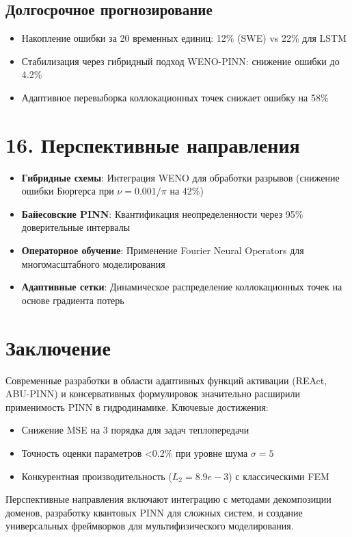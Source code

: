 \subsection*{Долгосрочное прогнозирование}
\begin{itemize}
    \item Накопление ошибки за 20 временных единиц: 12\% (SWE) vs 22\% для LSTM
    \item Стабилизация через гибридный подход WENO-PINN: снижение ошибки до 4.2\%
    \item Адаптивное перевыборка коллокационных точек снижает ошибку на 58\%
\end{itemize}

\section*{16. Перспективные направления}
\begin{itemize}
    \item \textbf{Гибридные схемы}: Интеграция WENO для обработки разрывов (снижение ошибки Бюргерса при $\nu=0.001/\pi$ на 42\%)
    \item \textbf{Байесовские PINN}: Квантификация неопределенности через 95\% доверительные интервалы
    \item \textbf{Операторное обучение}: Применение Fourier Neural Operators для многомасштабного моделирования
    \item \textbf{Адаптивные сетки}: Динамическое распределение коллокационных точек на основе градиента потерь
\end{itemize}

\section*{Заключение}
Современные разработки в области адаптивных функций активации (REAct, ABU-PINN) и консервативных формулировок значительно расширили применимость PINN в гидродинамике. Ключевые достижения:
\begin{itemize}
    \item Снижение MSE на 3 порядка для задач теплопередачи
    \item Точность оценки параметров <0.2\% при уровне шума $\sigma=5$
    \item Конкурентная производительность ($L_2=8.9e-3$) с классическими FEM
\end{itemize}

Перспективные направления включают интеграцию с методами декомпозиции доменов, разработку квантовых PINN для сложных систем, и создание универсальных фреймворков для мультифизического моделирования.
